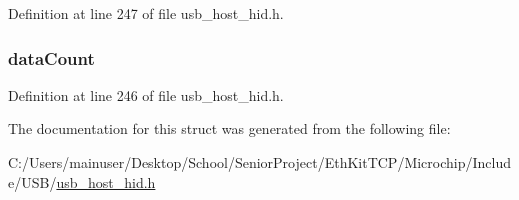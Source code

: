 Definition at line 247 of file usb\+\_\+host\+\_\+hid.\+h.

\hypertarget{struct___h_i_d___t_r_a_n_s_f_e_r___d_a_t_a_ae06ef282125e03d753ff6ad3acff2241}{}
\subsubsection[{data\+Count}]{ data\+Count}\label{struct___h_i_d___t_r_a_n_s_f_e_r___d_a_t_a_ae06ef282125e03d753ff6ad3acff2241}


Definition at line 246 of file usb\+\_\+host\+\_\+hid.\+h.



The documentation for this struct was generated from the following file\+:\begin{DoxyCompactItemize}
\item 
C\+:/\+Users/mainuser/\+Desktop/\+School/\+Senior\+Project/\+Eth\+Kit\+T\+C\+P/\+Microchip/\+Include/\+U\+S\+B/\hyperlink{usb__host__hid_8h}{usb\+\_\+host\+\_\+hid.\+h}\end{DoxyCompactItemize}
